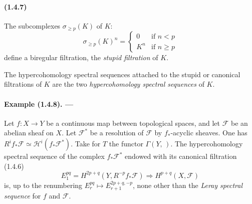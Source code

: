 \documentclass[10pt]{article}
\newcommand{\calH}{\mathcal H}
\newcommand{\calF}{\mathcal F}
\begin{document}
\paragraph{(1.4.7)} The subcomplexes $\sigma_{\ge p}(K)$ of $K$:
\[
\sigma_{\ge p}(K)^n=\begin{cases}
0& \text{if }n<p\\
K^n& \text{if }n\ge p
\end{cases}
\]
define a biregular filtration, the \emph{stupid filtration} of $K$.

The hypercohomology spectral sequences attached to the stupid or canonical filtrations of $K$ are the two \emph{hypercohomology spectral sequences} of $K$.

\paragraph{Example (1.4.8). ---} Let $f:X\to Y$ be a continuous map between topological spaces, and let $\calF$ be an abelian sheaf on $X$. Let $\calF^*$ be a resolution of $\calF$ by $f_*$-acyclic sheaves. One has $R^if_*\calF\simeq\calH^i(f_*\calF^*)$. Take for $T$ the functor $\Gamma(Y,\,)$. The hypercohomology spectral sequence of the complex $f_*\calF^*$ endowed with its canonical filtration (1.4.6)
\[
E_1^{pq}=H^{2p+q}(Y,R^{-p}f_*\calF)\Rightarrow H^{p+q}(X,\calF)
\]
is, up to the renumbering $E_r^{pq}\mapsto E_{r+1}^{2p+q,-p}$, none other than the \emph{Leray spectral sequence} for $f$ and $\calF$.
\end{document}
